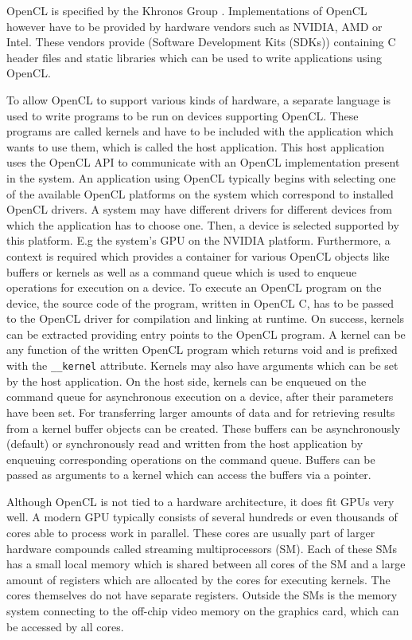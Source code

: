OpenCL is specified by the Khronos Group \cite{opencl_spec}. Implementations of OpenCL however have to be provided by hardware vendors such as NVIDIA, AMD or Intel. These vendors provide (Software Development Kits (SDKs)) containing C header files and static libraries which can be used to write applications using OpenCL.

To allow OpenCL to support various kinds of hardware, a separate language is used to write programs to be run on devices supporting OpenCL. These programs are called kernels and have to be included with the application which wants to use them, which is called the host application. This host application uses the OpenCL API to communicate with an OpenCL implementation present in the system. An application using OpenCL typically begins with selecting one of the available OpenCL platforms on the system which correspond to installed OpenCL drivers. A system may have different drivers for different devices from which the application has to choose one. Then, a device is selected supported by this platform. E.g the system's GPU on the NVIDIA platform. Furthermore, a context is required which provides a container for various OpenCL objects like buffers or kernels as well as a command queue which is used to enqueue operations for execution on a device.
To execute an OpenCL program on the device, the source code of the program, written in OpenCL C, has to be passed to the OpenCL driver for compilation and linking at runtime. On success, kernels can be extracted providing entry points to the OpenCL program. A kernel can be any function of the written OpenCL program which returns void and is prefixed with the \lstinline!__kernel! attribute. Kernels may also have arguments which can be set by the host application. On the host side, kernels can be enqueued on the command queue for asynchronous execution on a device, after their parameters have been set. For transferring larger amounts of data and for retrieving results from a kernel buffer objects can be created. These buffers can be asynchronously (default) or synchronously read and written from the host application by enqueuing corresponding operations on the command queue. Buffers can be passed as arguments to a kernel which can access the buffers via a pointer.

Although OpenCL is not tied to a hardware architecture, it does fit GPUs very well. A modern GPU typically consists of several hundreds or even thousands of cores able to process work in parallel. These cores are usually part of larger hardware compounds called streaming multiprocessors (SM). Each of these SMs has a small local memory which is shared between all cores of the SM and a large amount of registers which are allocated by the cores for executing kernels. The cores themselves do not have separate registers. Outside the SMs is the memory system connecting to the off-chip video memory on the graphics card, which can be accessed by all cores. 


